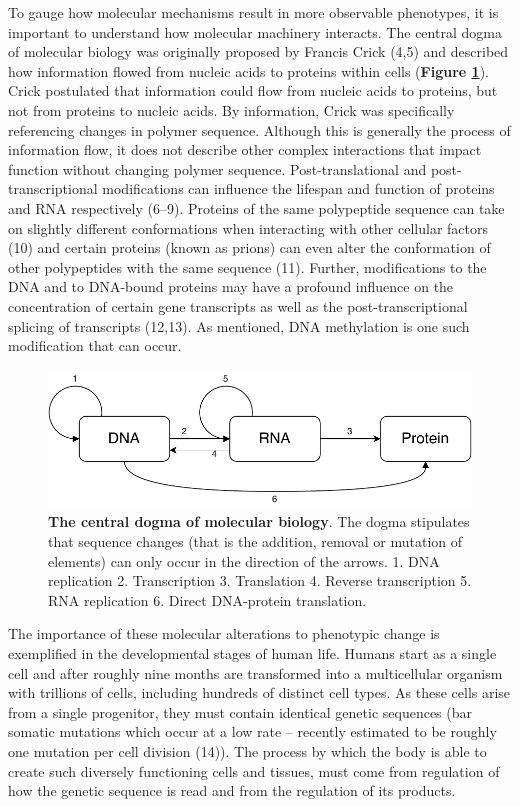 \documentclass[11pt,oneside]{bristolthesis}
\begin{document}
To gauge how molecular mechanisms result in more observable phenotypes, it is important to understand how molecular machinery interacts. The central dogma of molecular biology was originally proposed by Francis Crick (4,5) and described how information flowed from nucleic acids to proteins within cells (\textbf{Figure \ref{fig:central-dogma}}). Crick postulated that information could flow from nucleic acids to proteins, but not from proteins to nucleic acids. By information, Crick was specifically referencing changes in polymer sequence. Although this is generally the process of information flow, it does not describe other complex interactions that impact function without changing polymer sequence. Post-translational and post-transcriptional modifications can influence the lifespan and function of proteins and RNA respectively (6--9). Proteins of the same polypeptide sequence can take on slightly different conformations when interacting with other cellular factors (10) and certain proteins (known as prions) can even alter the conformation of other polypeptides with the same sequence (11). Further, modifications to the DNA and to DNA-bound proteins may have a profound influence on the concentration of certain gene transcripts as well as the post-transcriptional splicing of transcripts (12,13). As mentioned, DNA methylation is one such modification that can occur.




\begin{figure}

{\centering \includegraphics[width=1\linewidth]{figure/01-introduction/central-dogma} 

}

\caption[The central dogma of molecular biology]{\textbf{The central dogma of molecular biology}. The dogma stipulates that sequence changes (that is the addition, removal or mutation of elements) can only occur in the direction of the arrows. 1. DNA replication 2. Transcription 3. Translation 4. Reverse transcription 5. RNA replication 6. Direct DNA-protein translation.}\label{fig:central-dogma}
\end{figure}
The importance of these molecular alterations to phenotypic change is exemplified in the developmental stages of human life. Humans start as a single cell and after roughly nine months are transformed into a multicellular organism with trillions of cells, including hundreds of distinct cell types. As these cells arise from a single progenitor, they must contain identical genetic sequences (bar somatic mutations which occur at a low rate -- recently estimated to be roughly one mutation per cell division (14)). The process by which the body is able to create such diversely functioning cells and tissues, must come from regulation of how the genetic sequence is read and from the regulation of its products.
\end{document}
